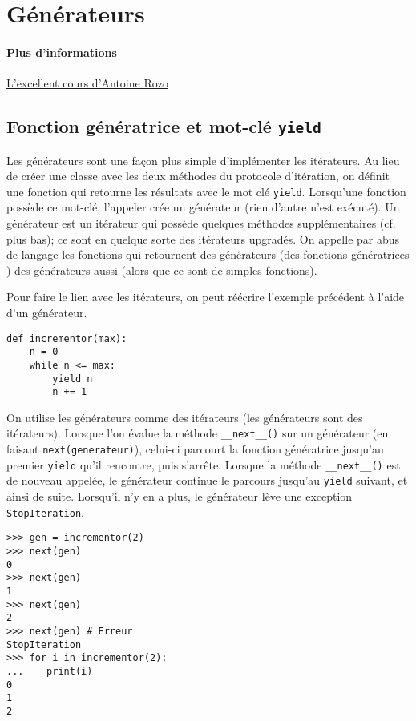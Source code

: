\section{Générateurs}

\paragraph{Plus d'informations} \href{https://zestedesavoir.com/tutoriels/954/notions-de-python-avancees/3-further/1-generators/}{L'excellent cours d'Antoine Rozo}
\subsection{Fonction génératrice et mot-clé \texttt{yield}}

Les générateurs sont une façon plus simple d'implémenter les itérateurs. Au lieu de créer une classe avec les deux méthodes du protocole d'itération, on définit une fonction qui retourne les résultats avec le mot clé \texttt{yield}. Lorsqu'une fonction possède ce mot-clé, l'appeler crée un générateur (rien d'autre n'est exécuté). Un générateur est un itérateur qui possède quelques méthodes supplémentaires (cf. plus bas); ce sont en quelque sorte des itérateurs upgradés. On appelle par abus de langage les fonctions qui retournent des générateurs (des \og fonctions génératrices \fg{}) des générateurs aussi (alors que ce sont de simples fonctions).\medskip

Pour faire le lien avec les itérateurs, on peut réécrire l'exemple précédent à l'aide d'un générateur.
\begin{verbatim}
def incrementor(max):
    n = 0
    while n <= max:
        yield n
        n += 1
\end{verbatim}

On utilise les générateurs comme des itérateurs (les générateurs sont des itérateurs). Lorsque l'on évalue la méthode \texttt{__next__()} sur un générateur (en faisant \texttt{next(generateur)}), celui-ci parcourt la fonction génératrice jusqu'au premier \texttt{yield} qu'il rencontre, puis s'arrête. Lorsque la méthode \texttt{__next__()} est de nouveau appelée, le générateur continue le parcours jusqu'au \texttt{yield} suivant, et ainsi de suite. Lorsqu'il n'y en a plus, le générateur lève une exception \texttt{StopIteration}.
\begin{verbatim}
>>> gen = incrementor(2)
>>> next(gen)
0
>>> next(gen)
1
>>> next(gen)
2
>>> next(gen) # Erreur
StopIteration
>>> for i in incrementor(2):
...    print(i)
0
1
2
\end{verbatim}

